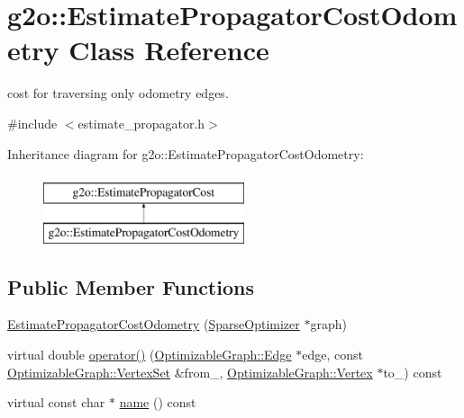 \hypertarget{classg2o_1_1_estimate_propagator_cost_odometry}{}\section{g2o\+:\+:Estimate\+Propagator\+Cost\+Odometry Class Reference}
\label{classg2o_1_1_estimate_propagator_cost_odometry}


cost for traversing only odometry edges.  




{\ttfamily \#include $<$estimate\+\_\+propagator.\+h$>$}

Inheritance diagram for g2o\+:\+:Estimate\+Propagator\+Cost\+Odometry\+:\begin{figure}[H]
\begin{center}
\leavevmode
\includegraphics[height=2.000000cm]{classg2o_1_1_estimate_propagator_cost_odometry}
\end{center}
\end{figure}
\subsection*{Public Member Functions}
\begin{DoxyCompactItemize}
\item 
\mbox{\hyperlink{classg2o_1_1_estimate_propagator_cost_odometry_a426a53e3cce07b71a129cc53754e9f1a}{Estimate\+Propagator\+Cost\+Odometry}} (\mbox{\hyperlink{classg2o_1_1_sparse_optimizer}{Sparse\+Optimizer}} $\ast$graph)
\item 
virtual double \mbox{\hyperlink{classg2o_1_1_estimate_propagator_cost_odometry_a3da1f1d67f717d0dbc0077db1c571146}{operator()}} (\mbox{\hyperlink{classg2o_1_1_optimizable_graph_1_1_edge}{Optimizable\+Graph\+::\+Edge}} $\ast$edge, const \mbox{\hyperlink{classg2o_1_1_hyper_graph_a703938cdb4bb636860eed55a2489d70c}{Optimizable\+Graph\+::\+Vertex\+Set}} \&from\+\_\+, \mbox{\hyperlink{classg2o_1_1_optimizable_graph_1_1_vertex}{Optimizable\+Graph\+::\+Vertex}} $\ast$to\+\_\+) const
\item 
virtual const char $\ast$ \mbox{\hyperlink{classg2o_1_1_estimate_propagator_cost_odometry_a6e610e7413e8973453943c5b4b9423aa}{name}} () const
\end{DoxyCompactItemize}

